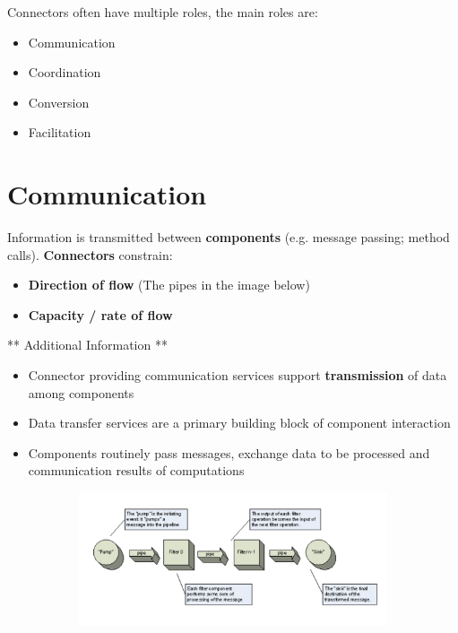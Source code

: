\documentclass[a4paper]{report}
\begin{document}
Connectors often have multiple roles, the main roles are:
\begin{itemize}
\item Communication
\item Coordination
\item Conversion
\item Facilitation
\end{itemize}

\section{Communication}
Information is transmitted between \textbf{components} (e.g. message passing; method calls). \textbf{Connectors} constrain:
\begin{itemize}
\item \textbf{Direction of flow }(The pipes in the image below)
\item \textbf{Capacity / rate of flow}\\
\end{itemize}

** Additional Information **
\begin{itemize}
\item Connector providing communication services support \textbf{transmission} of data among components
\item Data transfer services are a primary building block of component interaction
\item Components routinely pass messages, exchange data to be processed and communication results of computations
\end{itemize}

\begin{figure}[H]
\centering
\hskip-2.5cm\begin{subfigure}{1\textwidth}
  \includegraphics[width=1\linewidth]
  {images/10-pipes.png}
\end{subfigure}
\end{figure}
\end{document}
